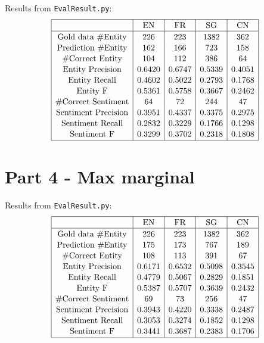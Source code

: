 \documentclass[12pt]{article}
\begin{document}
Results from \verb|EvalResult.py|:
\[
\begin{array}{|c|c|c|c|c|}
\hline \rule{0pt}{1em}
& \mbox{EN} & \mbox{FR} & \mbox{SG} & \mbox{CN} \\
\hline \rule{0pt}{1em}
\mbox{Gold data \#Entity} & 226    & 223    & 1382   & 362    \\[0.1em]
\mbox{Prediction \#Entity}& 162    & 166    & 723    & 158    \\[0.1em]
\mbox{\#Correct Entity}   & 104    & 112    & 386    & 64     \\[0.1em]
\mbox{Entity Precision}   & 0.6420 & 0.6747 & 0.5339 & 0.4051 \\[0.1em]
\mbox{Entity Recall}      & 0.4602 & 0.5022 & 0.2793 & 0.1768 \\[0.1em]
\mbox{Entity F}           & 0.5361 & 0.5758 & 0.3667 & 0.2462 \\[0.1em]
\mbox{\#Correct Sentiment}& 64     & 72     & 244    & 47     \\[0.1em]
\mbox{Sentiment Precision}& 0.3951 & 0.4337 & 0.3375 & 0.2975 \\[0.1em]
\mbox{Sentiment Recall}   & 0.2832 & 0.3229 & 0.1766 & 0.1298 \\[0.1em]
\mbox{Sentiment F}        & 0.3299 & 0.3702 & 0.2318 & 0.1808 \\[0.1em] 
\hline
\end{array}
\]



\pagebreak

\section{Part 4 - Max marginal}

Results from \verb|EvalResult.py|:
\[
\begin{array}{|c|c|c|c|c|}
\hline \rule{0pt}{1em}
& \mbox{EN} & \mbox{FR} & \mbox{SG} & \mbox{CN} \\
\hline \rule{0pt}{1em}
\mbox{Gold data \#Entity} & 226    & 223    & 1382   & 362    \\[0.1em]
\mbox{Prediction \#Entity}& 175    & 173    & 767    & 189    \\[0.1em]
\mbox{\#Correct Entity}   & 108    & 113    & 391    & 67     \\[0.1em]
\mbox{Entity Precision}   & 0.6171 & 0.6532 & 0.5098 & 0.3545 \\[0.1em]
\mbox{Entity Recall}      & 0.4779 & 0.5067 & 0.2829 & 0.1851 \\[0.1em]
\mbox{Entity F}           & 0.5387 & 0.5707 & 0.3639 & 0.2432 \\[0.1em]
\mbox{\#Correct Sentiment}& 69     & 73     & 256    & 47     \\[0.1em]
\mbox{Sentiment Precision}& 0.3943 & 0.4220 & 0.3338 & 0.2487 \\[0.1em]
\mbox{Sentiment Recall}   & 0.3053 & 0.3274 & 0.1852 & 0.1298 \\[0.1em]
\mbox{Sentiment F}        & 0.3441 & 0.3687 & 0.2383 & 0.1706 \\[0.1em] 
\hline
\end{array}
\]
\end{document}
